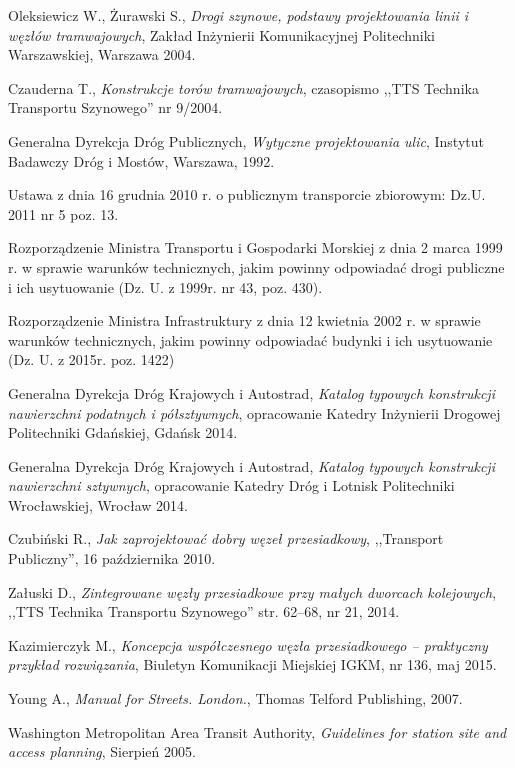 \begin{thebibliography}{99}
	Oleksiewicz W., Żurawski S., \emph{Drogi szynowe, podstawy projektowania linii i węzłów tramwajowych}, Zakład Inżynierii Komunikacyjnej Politechniki Warszawskiej, Warszawa 2004.
	
	Czauderna T., \emph{Konstrukcje torów tramwajowych}, czasopismo ,,TTS Technika Transportu Szynowego'' nr 9/2004.
	
	Generalna Dyrekcja Dróg Publicznych, \emph{Wytyczne projektowania ulic}, Instytut Badawczy Dróg i Mostów, Warszawa, 1992.
	
	Ustawa z dnia 16 grudnia 2010 r. o publicznym transporcie zbiorowym: Dz.U. 2011 nr 5 poz. 13.
	
	Rozporządzenie Ministra Transportu i Gospodarki Morskiej z dnia 2 marca 1999 r. 
	w sprawie warunków technicznych, jakim powinny odpowiadać drogi publiczne i ich usytuowanie (Dz. U. z 1999r. nr 43, poz. 430).
	
	Rozporządzenie Ministra Infrastruktury z dnia 12 kwietnia 2002 r. 
	w sprawie warunków technicznych, jakim powinny odpowiadać budynki i ich usytuowanie (Dz. U. z 2015r. poz. 1422)
	
	Generalna Dyrekcja Dróg Krajowych i Autostrad, \emph{Katalog typowych konstrukcji nawierzchni podatnych i półsztywnych}, opracowanie Katedry Inżynierii Drogowej Politechniki Gdańskiej, Gdańsk 2014.
	
	Generalna Dyrekcja Dróg Krajowych i Autostrad, \emph{Katalog typowych konstrukcji nawierzchni sztywnych}, opracowanie Katedry Dróg i Lotnisk Politechniki Wrocławskiej, Wrocław 2014.
	
	Czubiński R., \emph{Jak zaprojektować dobry węzeł przesiadkowy}, ,,Transport Publiczny'', 16 października 2010.
	
	Załuski D., \emph{Zintegrowane węzły przesiadkowe przy małych dworcach kolejowych}, 
	,,TTS Technika Transportu Szynowego'' str. 62--68, nr 21, 2014.
	
	Kazimierczyk M., \emph{Koncepcja współczesnego węzła przesiadkowego -- praktyczny przykład rozwiązania}, Biuletyn Komunikacji Miejskiej IGKM, nr 136, maj 2015.
	
	Young A., \emph{Manual for Streets. London.}, Thomas Telford Publishing, 2007.
	
	Washington Metropolitan Area Transit Authority, \emph{Guidelines for station site and access planning}, Sierpień 2005.
	

\end{thebibliography}
